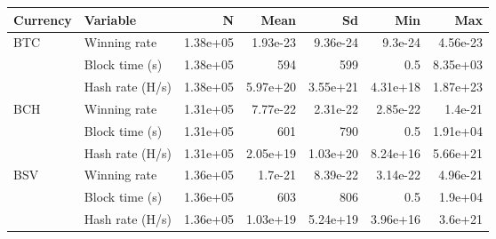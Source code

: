 
\begin{tabular}[t]{llrrrrr}
\toprule
Currency & Variable & N & Mean & Sd & Min & Max\\
\midrule
BTC & Winning rate & 1.38e+05 & 1.93e-23 & 9.36e-24 & 9.3e-24 & 4.56e-23\\
 & Block time (s) & 1.38e+05 & 594 & 599 & 0.5 & 8.35e+03\\
 & Hash rate (H/s) & 1.38e+05 & 5.97e+20 & 3.55e+21 & 4.31e+18 & 1.87e+23\\
BCH & Winning rate & 1.31e+05 & 7.77e-22 & 2.31e-22 & 2.85e-22 & 1.4e-21\\
 & Block time (s) & 1.31e+05 & 601 & 790 & 0.5 & 1.91e+04\\
 & Hash rate (H/s) & 1.31e+05 & 2.05e+19 & 1.03e+20 & 8.24e+16 & 5.66e+21\\
BSV & Winning rate & 1.36e+05 & 1.7e-21 & 8.39e-22 & 3.14e-22 & 4.96e-21\\
 & Block time (s) & 1.36e+05 & 603 & 806 & 0.5 & 1.9e+04\\
 & Hash rate (H/s) & 1.36e+05 & 1.03e+19 & 5.24e+19 & 3.96e+16 & 3.6e+21\\
\bottomrule
\end{tabular}
